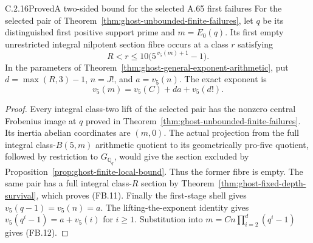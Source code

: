 \begin{result}{C.2.16}{Proved}{A two-sided bound for the selected A.65 first failures}
\label{cor:ghost-selected-failure-bound}
For the selected pair of
Theorem~\ref{thm:ghost-unbounded-finite-failures},
let \(q\) be its distinguished first positive
support prime and \(m=E_0(q)\).
Its first empty unrestricted integral
nilpotent section fibre occurs at a class \(r\)
satisfying
\[
 R<r\le10\bigl(5^{\,v_5(m)+1}-1\bigr).
 \tag{FB.11}
\]
In the parameters of Theorem~\ref{thm:ghost-general-exponent-arithmetic},
put \(d=\max(R,3)-1\), \(n=J!\), and \(a=v_5(n)\).
The exact exponent is
\[
 v_5(m)=v_5(C)+da+v_5(d!).
 \tag{FB.12}
\]
\end{result}
\begin{proof}
Every integral class-two lift of the selected
pair has the nonzero central Frobenius image
at \(q\) proved in
Theorem~\ref{thm:ghost-unbounded-finite-failures}.
Its inertia abelian coordinates are \((m,0)\).
The actual projection from the full integral
class-\(B(5,m)\) arithmetic quotient to its
geometrically pro-five quotient, followed by
restriction to \(G_{\mathbb Q_q}\), would give
the section excluded by
Proposition~\ref{prop:ghost-finite-local-bound}.
Thus the former fibre is empty.
The same pair has a full integral class-\(R\)
section by Theorem~\ref{thm:ghost-fixed-depth-survival},
which proves (FB.11).
Finally the first-stage shell gives
\(v_5(q-1)=v_5(n)=a\).
The lifting-the-exponent identity gives
\(v_5(q^i-1)=a+v_5(i)\) for \(i\ge1\).
Substitution into
\(m=Cn\prod_{i=2}^d(q^i-1)\)
gives (FB.12).
\end{proof}

